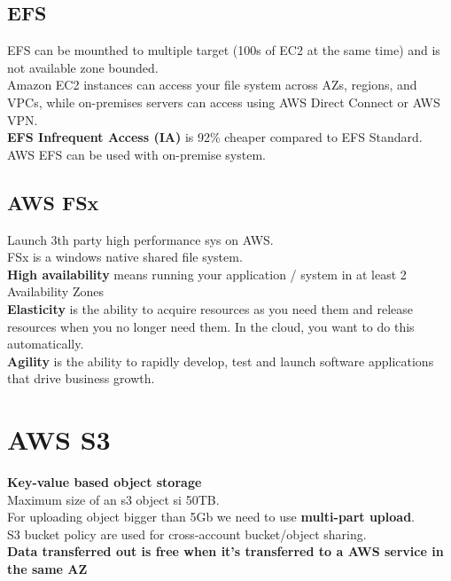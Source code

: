 \documentclass[12pt, letterpaper, twoside]{article}
\begin{document}
\subsection{EFS}
EFS can be mounthed to multiple target (100s of EC2 at the same time) and is not
available zone bounded.\\
Amazon EC2 instances can access your file system across AZs, regions, and VPCs, while on-premises servers 
can access using AWS Direct Connect or AWS VPN.\\
\textbf{EFS Infrequent Access (IA)} is 92\% cheaper compared to EFS Standard.\\
AWS EFS can be used with on-premise system.\\

\subsection {AWS FSx}
Launch 3th party high performance sys on AWS.\\
FSx is a windows native shared file system.\\

\textbf{High availability} means running your application / system in at least 2 Availability Zones\\

\textbf{Elasticity} is the ability to acquire resources as you need them and release resources when you no 
longer need them. In the cloud, you want to do this automatically.\\

\textbf{Agility} is the ability to rapidly develop, test and launch software applications that drive business growth.\\

\section{AWS S3}
\textbf{Key-value based object storage}\\
Maximum size of an s3 object si 50TB.\\
For uploading object bigger than 5Gb we need to use \textbf{multi-part upload}.\\

S3 bucket policy are used for cross-account bucket/object sharing.\\

\textbf{Data transferred out is free when it's transferred to a AWS service in the same AZ}\\
\end{document}
